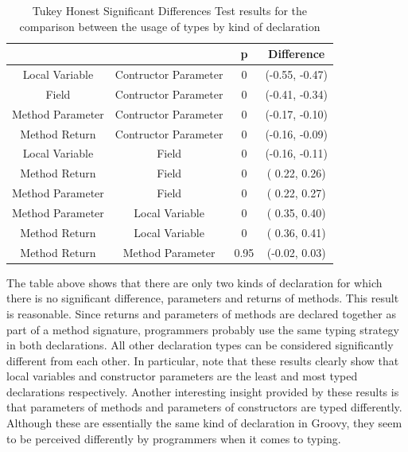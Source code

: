 \documentclass[msc]{ppgccufmg}
\renewcommand{\arraystretch}{1.2}
\begin{document}
\begin{table}[ht]

\centering{}%
\renewcommand{\arraystretch}{1.2}

\caption{Tukey Honest Significant Differences Test results for the comparison between the usage of types by kind of declaration}
\begin{tabular}{|c|c|c|c|}
\hline 
                & {}          & p         & Difference \\
\hline
\hline
Local Variable & Contructor Parameter & 0      & (-0.55, -0.47) \\ \hline
Field & Contructor Parameter & 0      & (-0.41, -0.34) \\ \hline
Method Parameter & Contructor Parameter & 0      & (-0.17, -0.10) \\ \hline
Method Return & Contructor Parameter & 0      & (-0.16, -0.09) \\ \hline
Local Variable & Field & 0      & (-0.16, -0.11) \\ \hline
Method Return & Field & 0      & ( 0.22,  0.26) \\ \hline
Method Parameter & Field & 0      & ( 0.22,  0.27) \\ \hline
Method Parameter& Local Variable & 0      & ( 0.35,  0.40) \\ \hline
Method Return & Local Variable & 0      & ( 0.36,  0.41) \\ \hline
Method Return & Method Parameter& 0.95 & (-0.02,  0.03) \\ \hline
\end{tabular}
\label{tab:all_utest_type}
\end{table}




The table above shows that there are only two kinds of declaration for which there is no significant difference, parameters and returns of methods.
This result is reasonable.
Since returns and parameters of methods are declared together as part of a method signature, programmers probably use the same typing strategy in both declarations.
All other declaration types can be considered significantly different from each other.
In particular, note that these results clearly show that local variables and constructor parameters are the least and most typed declarations respectively.
Another interesting insight provided by these results is that parameters of methods and parameters of constructors are typed differently.
Although these are essentially the same kind of declaration in Groovy, they seem to be perceived differently by programmers when it comes to typing.
\end{document}
